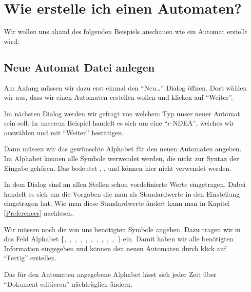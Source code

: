 \chapter{Wie erstelle ich einen Automaten?}

Wir wollen uns ahand des folgenden Beispiels anschauen wie ein Automat erstellt
wird:\vspace{10pt}

\section{Neue Automat Datei anlegen}

Am Anfang müssen wir dazu erst einmal den "`Neu\ldots"' Dialog öffnen. Dort
wählen wir aus, dass wir einen Automaten erstellen wollen und klicken
auf "`Weiter"'.\vspace{10pt}

Im nächsten Dialog werden wir gefragt von welchem Typ unser neuer
Automat sein soll. In unserem Beispiel handelt es sich um eine
"`$\epsilon$-NDEA"', welches wir auswählen und mit "`Weiter"'
bestätigen.\vspace{10pt}

Dann müssen wir das gewünschte Alphabet für den neuen Automaten
angeben. Im Alphabet können alle Symbole werwendet werden, die nicht zur Syntax
der Eingabe gehören. Das bedeutet \Symbol{,}, \Symbol{\{}, \Symbol{\}} und
\SymbolEmpty{} können hier nicht verwendet werden.\vspace{10pt}

In dem Dialog sind an allen Stellen schon vordefinierte Werte eingetragen. Dabei
handelt es sich um die Vorgaben die man als Standardwerte in den Einstellung
eingetragen hat. Wie man diese Standardwerte ändert kann man in Kapitel
\ref{Preferences} nachlesen.\vspace{10pt}

Wir müssen noch die von uns benötigten Symbole angeben. Dazu tragen wir in das
Feld Alphabet \{,\ ,\ ,\ ,\
,\ ,\ ,\ ,\ ,\ ,\
\Symbol{-}\} ein. Damit haben wir alle benötigten Information eingegeben und
können den neuen Automaten durch klick auf "`Fertig"' erstellen.\vspace{10pt}
\vspace{10pt} 

Das für den Automaten angegebene Alphabet lässt sich jeder Zeit über "`Dokument
editieren"' nächträglich ändern.

